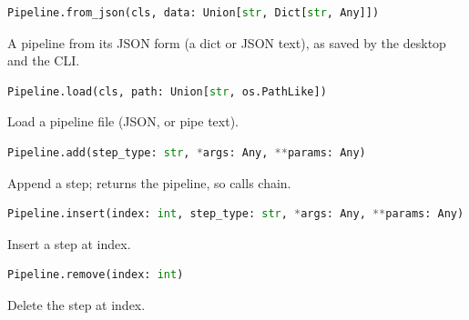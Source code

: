 \begin{samepage}

\begin{lstlisting}[language=Python]
Pipeline.from_json(cls, data: Union[str, Dict[str, Any]])
\end{lstlisting}

A pipeline from its JSON form (a dict or JSON text), as saved by the desktop and the CLI.

\end{samepage}



\begin{samepage}

\begin{lstlisting}[language=Python]
Pipeline.load(cls, path: Union[str, os.PathLike])
\end{lstlisting}

Load a pipeline file (JSON, or pipe text).

\end{samepage}



\begin{samepage}

\begin{lstlisting}[language=Python]
Pipeline.add(step_type: str, *args: Any, **params: Any)
\end{lstlisting}

Append a step; returns the pipeline, so calls chain.

\end{samepage}



\begin{samepage}

\begin{lstlisting}[language=Python]
Pipeline.insert(index: int, step_type: str, *args: Any, **params: Any)
\end{lstlisting}

Insert a step at index.

\end{samepage}



\begin{samepage}

\begin{lstlisting}[language=Python]
Pipeline.remove(index: int)
\end{lstlisting}

Delete the step at index.

\end{samepage}



